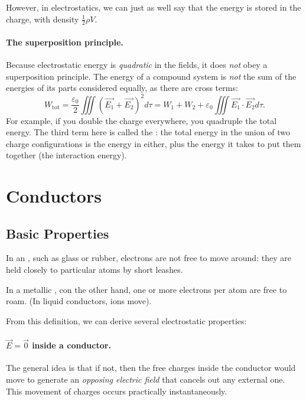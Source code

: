 However, in electrostatics, we can just as well say that the energy is stored in the charge, with density $\frac{1}{2}\rho V$.

\paragraph{The superposition principle.} Because electrostatic energy is \textit{quadratic} in the fields, it does \textit{not} obey a superposition principle. The energy of a compound system is \textit{not} the sum of the energies of its parts considered equally, as there are cross terms:
\[W_{\text{tot}}=\frac{\varepsilon_0}2\iiint (\vec{E_1}+\vec{E_2})^2d\tau=W_1+W_2+\varepsilon_0\iiint \vec{E_1}\cdot\vec{E_2}d\tau.\]
For example, if you double the charge everywhere, you quadruple the total energy. The third term here is called the : the total energy in the union of two charge configurations is the energy in either, plus the energy it takes to put them together (the interaction energy).  

\section{Conductors}

\subsection{Basic Properties}

\begin{definition}
In an , such as glass or rubber, electrons are not free to move around: they are held closely to particular atoms by short leashes. 
\end{definition}

\begin{definition}
In a metallic , con the other hand, one or more electrons per atom are free to roam. (In liquid conductors, ions move).
\end{definition}

From this definition, we can derive several electrostatic properties:

\paragraph{$\vec{E}=\vec{0}$ inside a conductor.} The general idea is that if not, then the free charges inside the conductor would move to generate an \textit{opposing electric field} that cancels out any external one. This movement of charges occurs practically instantaneously.

